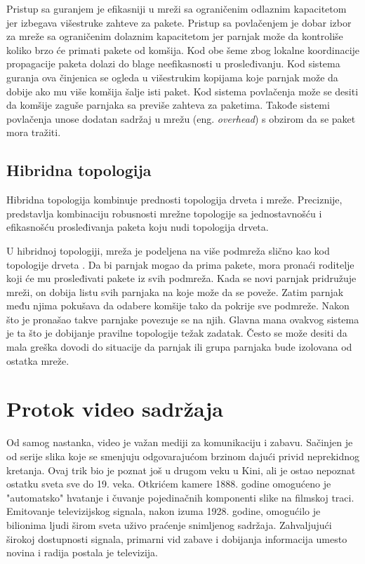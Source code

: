 \documentclass[12pt,oneside]{memoir}
\begin{document}
Pristup sa guranjem je efikasniji u mreži sa ograničenim odlaznim kapacitetom jer izbegava višestruke zahteve za pakete. Pristup sa povlačenjem je dobar izbor za mreže sa ograničenim dolaznim kapacitetom jer parnjak može da kontroliše koliko brzo će primati pakete od komšija. Kod obe šeme zbog lokalne koordinacije propagacije paketa dolazi do blage neefikasnosti u prosleđivanju. Kod sistema guranja ova činjenica se ogleda u višestrukim kopijama koje parnjak može da dobije ako mu više komšija šalje isti paket. Kod sistema povlačenja može se desiti da komšije zaguše parnjaka sa previše zahteva za paketima. Takođe sistemi povlačenja unose dodatan sadržaj u mrežu (eng. \textit{overhead}) s obzirom da se paket mora tražiti.

\subsection{Hibridna topologija}
\label{P2P.3.3}

Hibridna topologija kombinuje prednosti topologija drveta i mreže. Preciznije, predstavlja kombinaciju robusnosti mrežne topologije sa jednostavnošću i efikasnošću prosleđivanja paketa koju nudi topologija drveta.

U hibridnoj topologiji, mreža je podeljena na više podmreža slično kao kod topologije drveta \cite{Shen:2009}. Da bi parnjak mogao da prima pakete, mora pronaći roditelje koji će mu prosleđivati pakete iz svih podmreža. Kada se novi parnjak pridružuje mreži, on dobija listu svih parnjaka na koje može da se poveže. Zatim parnjak među njima pokušava da odabere komšije tako da pokrije sve podmreže. Nakon što je pronašao takve parnjake povezuje se na njih. Glavna mana ovakvog sistema je ta što je dobijanje pravilne topologije težak zadatak. Često se može desiti da mala greška dovodi do situacije da parnjak ili grupa parnjaka bude izolovana od ostatka mreže.

\section{Protok video sadržaja}
\label{P2P.4}

Od samog nastanka, video je važan mediji za komunikaciju i zabavu. Sačinjen je od serije slika koje se smenjuju odgovarajućom brzinom dajući privid neprekidnog kretanja. Ovaj trik bio je poznat još u drugom veku u Kini, ali je ostao nepoznat ostatku sveta sve do 19. veka. Otkrićem kamere 1888. godine omogućeno je "automatsko" hvatanje i čuvanje pojedinačnih komponenti slike na filmskoj traci. Emitovanje televizijskog signala, nakon izuma 1928. godine, omogućilo je bilionima ljudi širom sveta uživo praćenje snimljenog sadržaja. Zahvaljujući širokoj dostupnosti signala, primarni vid zabave i dobijanja informacija umesto novina i radija postala je televizija.
\end{document}
